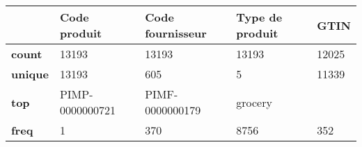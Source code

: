 \begin{tabularx}{\linewidth}{lXXXX}
\toprule
{} &     Code produit & Code fournisseur & Type de produit &   GTIN \\
\midrule
\textbf{count } &            13193 &            13193 &           13193 &  12025 \\
\textbf{unique} &            13193 &              605 &               5 &  11339 \\
\textbf{top   } &  PIMP-0000000721 &  PIMF-0000000179 &         grocery &        \\
\textbf{freq  } &                1 &              370 &            8756 &    352 \\
\bottomrule
\end{tabularx}
